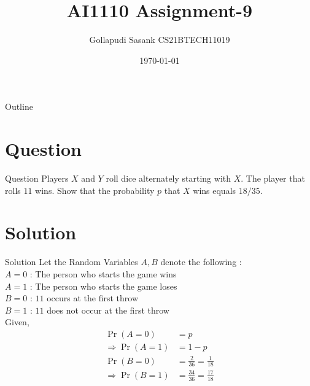 \documentclass{beamer}
\title{AI1110 Assignment-9}
\author{Gollapudi Sasank CS21BTECH11019}
\date{\today}
\providecommand{\pr}[1]{\ensuremath{\Pr\left(#1\right)}}
\begin{document}
\begin{frame}
    \titlepage 
\end{frame}

\logo{}


\begin{frame}{Outline}
    \tableofcontents
\end{frame}


\section{Question}
\begin{frame}{Question}
Players $X$ and $Y$ roll dice alternately starting with $X$. The player that rolls $11$ wins. Show that the probability $p$ that $X$ wins equals $18/35$.
\end{frame}


\section{Solution}
\begin{frame}{Solution}
Let the Random Variables $A,B$ denote the following : \\
$A=0$ : The person who starts the game  wins \\
$A=1$ : The person who starts the game  loses \\
$B=0$ : $11$ occurs at the first throw \\
$B=1$ : $11$ does not occur at the first throw \\
Given,
\begin{align}
\pr{A=0} &= p \\
\Rightarrow \pr{A=1} &= 1-p \\
\pr{B=0} &= \frac{2}{36} = \frac{1}{18} \\
\Rightarrow \pr{B=1} &= \frac{34}{36} = \frac{17}{18}
\end{align}
\end{frame} 
\end{document}
